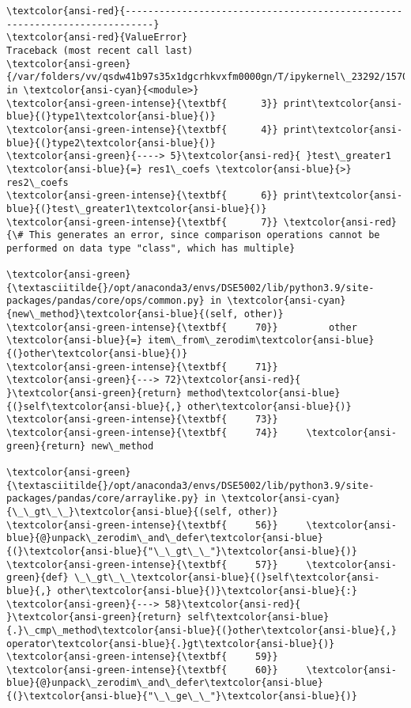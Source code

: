 \documentclass[11pt]{article}
\begin{document}
    \begin{Verbatim}[commandchars=\\\{\}, frame=single, framerule=2mm, rulecolor=\color{outerrorbackground}]
\textcolor{ansi-red}{---------------------------------------------------------------------------}
\textcolor{ansi-red}{ValueError}                                Traceback (most recent call last)
\textcolor{ansi-green}{/var/folders/vv/qsdw41b97s35x1dgcrhkvxfm0000gn/T/ipykernel\_23292/1570535550.py} in \textcolor{ansi-cyan}{<module>}
\textcolor{ansi-green-intense}{\textbf{      3}} print\textcolor{ansi-blue}{(}type1\textcolor{ansi-blue}{)}
\textcolor{ansi-green-intense}{\textbf{      4}} print\textcolor{ansi-blue}{(}type2\textcolor{ansi-blue}{)}
\textcolor{ansi-green}{----> 5}\textcolor{ansi-red}{ }test\_greater1 \textcolor{ansi-blue}{=} res1\_coefs \textcolor{ansi-blue}{>} res2\_coefs
\textcolor{ansi-green-intense}{\textbf{      6}} print\textcolor{ansi-blue}{(}test\_greater1\textcolor{ansi-blue}{)}
\textcolor{ansi-green-intense}{\textbf{      7}} \textcolor{ansi-red}{\# This generates an error, since comparison operations cannot be performed on data type "class", which has multiple}

\textcolor{ansi-green}{\textasciitilde{}/opt/anaconda3/envs/DSE5002/lib/python3.9/site-packages/pandas/core/ops/common.py} in \textcolor{ansi-cyan}{new\_method}\textcolor{ansi-blue}{(self, other)}
\textcolor{ansi-green-intense}{\textbf{     70}}         other \textcolor{ansi-blue}{=} item\_from\_zerodim\textcolor{ansi-blue}{(}other\textcolor{ansi-blue}{)}
\textcolor{ansi-green-intense}{\textbf{     71}} 
\textcolor{ansi-green}{---> 72}\textcolor{ansi-red}{         }\textcolor{ansi-green}{return} method\textcolor{ansi-blue}{(}self\textcolor{ansi-blue}{,} other\textcolor{ansi-blue}{)}
\textcolor{ansi-green-intense}{\textbf{     73}} 
\textcolor{ansi-green-intense}{\textbf{     74}}     \textcolor{ansi-green}{return} new\_method

\textcolor{ansi-green}{\textasciitilde{}/opt/anaconda3/envs/DSE5002/lib/python3.9/site-packages/pandas/core/arraylike.py} in \textcolor{ansi-cyan}{\_\_gt\_\_}\textcolor{ansi-blue}{(self, other)}
\textcolor{ansi-green-intense}{\textbf{     56}}     \textcolor{ansi-blue}{@}unpack\_zerodim\_and\_defer\textcolor{ansi-blue}{(}\textcolor{ansi-blue}{"\_\_gt\_\_"}\textcolor{ansi-blue}{)}
\textcolor{ansi-green-intense}{\textbf{     57}}     \textcolor{ansi-green}{def} \_\_gt\_\_\textcolor{ansi-blue}{(}self\textcolor{ansi-blue}{,} other\textcolor{ansi-blue}{)}\textcolor{ansi-blue}{:}
\textcolor{ansi-green}{---> 58}\textcolor{ansi-red}{         }\textcolor{ansi-green}{return} self\textcolor{ansi-blue}{.}\_cmp\_method\textcolor{ansi-blue}{(}other\textcolor{ansi-blue}{,} operator\textcolor{ansi-blue}{.}gt\textcolor{ansi-blue}{)}
\textcolor{ansi-green-intense}{\textbf{     59}} 
\textcolor{ansi-green-intense}{\textbf{     60}}     \textcolor{ansi-blue}{@}unpack\_zerodim\_and\_defer\textcolor{ansi-blue}{(}\textcolor{ansi-blue}{"\_\_ge\_\_"}\textcolor{ansi-blue}{)}


\end{Verbatim}
\end{document}

